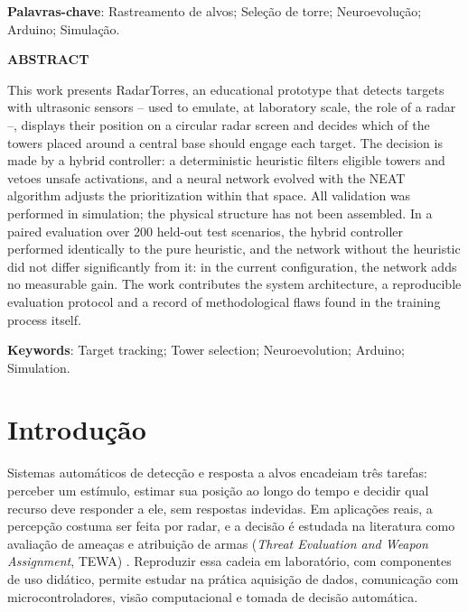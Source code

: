 \documentclass[12pt,a4paper]{article}
\begin{document}
\noindent\textbf{Palavras-chave}: Rastreamento de alvos; Seleção de torre; Neuroevolução; Arduino; Simulação.

\begin{center}
    \textbf{ABSTRACT}
\end{center}

\noindent This work presents RadarTorres, an educational prototype that detects targets with
ultrasonic sensors -- used to emulate, at laboratory scale, the role of a radar --, displays their
position on a circular radar screen and decides which of the towers placed around a central base
should engage each target. The decision is made by a hybrid controller: a deterministic
heuristic filters eligible towers and vetoes unsafe activations, and a neural network evolved with
the NEAT algorithm adjusts the prioritization within that space. All validation was performed in
simulation; the physical structure has not been assembled. In a paired evaluation over 200
held-out test scenarios, the hybrid controller performed identically to the pure heuristic, and the
network without the heuristic did not differ significantly from it: in the current configuration,
the network adds no measurable gain. The work contributes the system architecture, a reproducible
evaluation protocol and a record of methodological flaws found in the training process itself.

\noindent\textbf{Keywords}: Target tracking; Tower selection; Neuroevolution; Arduino; Simulation.

\clearpage

\section{Introdução}

Sistemas automáticos de detecção e resposta a alvos encadeiam três tarefas: perceber um estímulo,
estimar sua posição ao longo do tempo e decidir qual recurso deve responder a ele, sem respostas
indevidas. Em aplicações reais, a percepção costuma ser feita por radar, e a decisão é estudada
na literatura como avaliação de ameaças e atribuição de armas (\textit{Threat Evaluation and Weapon
Assignment}, TEWA) \cite{roux2007tewa}. Reproduzir essa cadeia em laboratório, com componentes de
uso didático, permite estudar na prática aquisição de dados, comunicação com microcontroladores,
visão computacional e tomada de decisão automática.
\end{document}
